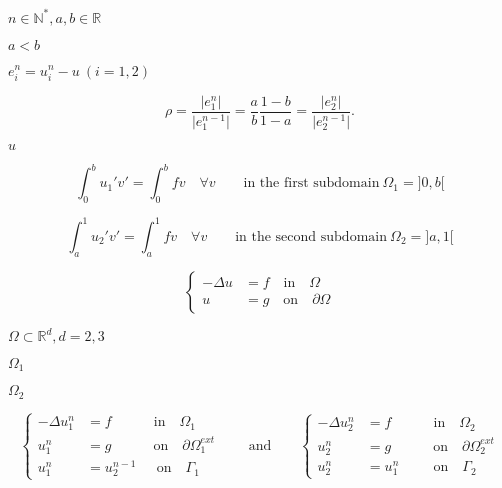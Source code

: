 \documentclass{article}
\begin{document}
$ n \in \mathbb N^*, a, b \in \mathbb R $
\pagebreak

$a < b$
\pagebreak

$e_i^n = u_i^n-u~(i=1,2)$
\pagebreak

\begin{equation} \rho = \frac{\vert e_1^n \vert}{\vert e_1^{n-1} \vert} = \frac{a}{b}\frac{1-b}{1-a} = \frac{\vert e_2^n \vert}{\vert e_2^{n-1} \vert} . \label{eq:32} \end{equation}
\pagebreak

$u$
\pagebreak

\begin{equation*} \int_0^b u_1'v' = \int_0^b fv \quad \forall v \qquad \text{in the first subdomain} ~\Omega_1 = ]0,b[ \end{equation*}
\pagebreak

\begin{equation*} \int_a^1 u_2'v' = \int_a^1 fv \quad \forall v \qquad \text{in the second subdomain} ~ \Omega_2 = ]a,1[ \end{equation*}
\pagebreak

\begin{equation} \left \{ \begin{aligned} -\Delta u & = f \quad \text{in} \quad \Omega \\ u & = g \quad \text{on} \quad \partial\Omega \end{aligned} \right. \label{eq:33} \end{equation}
\pagebreak

$\Omega \subset \mathbb R^d, d=2,3$
\pagebreak

$\Omega_1$
\pagebreak

$\Omega_2$
\pagebreak

\begin{equation} \label{eq:34} \left \{ \begin{aligned} -\Delta u_1^n & = f \quad \qquad \text{in} \quad \Omega_1 \\ u_1^n & = g \quad \qquad \text{on} \quad \partial \Omega_1^{ext}\\ u_1^n & = u_2^{n-1} \quad ~~ \text{on} \quad \Gamma_1 \end{aligned} \right. \qquad \text{and} \qquad \left \{ \begin{aligned} - \Delta u_2^n & = f \quad \qquad \text{in} \quad \Omega_2 \\ u_2^n & = g \quad \qquad \text{on} \quad \partial \Omega_2^{ext}\\ u_2^n & = u_1^n \qquad~~ \text{on} \quad \Gamma_2 \end{aligned} \right. \end{equation}
\pagebreak
\end{document}
